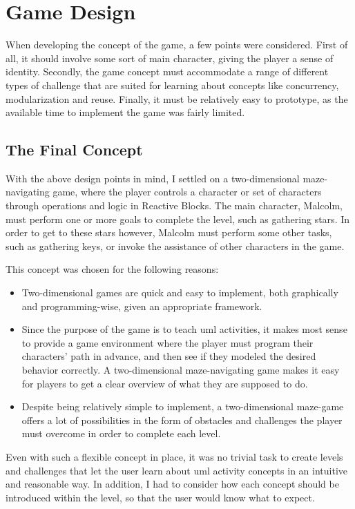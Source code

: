\section{Game Design}
\label{sec:game_design}
When developing the concept of the game, a few points were considered. First of all, it should involve some sort of main character, giving the player a sense of identity. Secondly, the game concept must accommodate a range of different types of challenge that are suited for learning about concepts like concurrency, modularization and reuse. Finally, it must be relatively easy to prototype, as the available time to implement the game was fairly limited.

\subsection{The Final Concept}
\label{sec:game_final_concept}
With the above design points in mind, I settled on a two-dimensional maze-navigating game, where the player controls a character or set of characters through operations and logic in Reactive Blocks. The main character, Malcolm, must perform one or more goals to complete the level, such as gathering stars. In order to get to these stars however, Malcolm must perform some other tasks, such as gathering keys, or invoke the assistance of other characters in the game.

\noindent
This concept was chosen for the following reasons:
\begin{itemize}
	\item Two-dimensional games are quick and easy to implement, both graphically and programming-wise, given an appropriate framework.
	\item Since the purpose of the game is to teach \gls{uml} activities, it makes most sense to provide a game environment where the player must program their characters' path in advance, and then see if they modeled the desired behavior correctly. A two-dimensional maze-navigating game makes it easy for players to get a clear overview of what they are supposed to do.
	\item Despite being relatively simple to implement, a two-dimensional maze-game offers a lot of possibilities in the form of obstacles and challenges the player must overcome in order to complete each level.
\end{itemize}

\noindent
Even with such a flexible concept in place, it was no trivial task to create levels and challenges that let the user learn about \gls{uml} activity concepts in an intuitive and reasonable way. In addition, I had to consider how each concept should be introduced within the level, so that the user would know what to expect.


